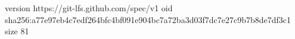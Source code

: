 version https://git-lfs.github.com/spec/v1
oid sha256:a77e97eb4c7edf264bfc4bf091e904bc7a72ba3d03f7dc7e27c9b7b8de7df3c1
size 81

